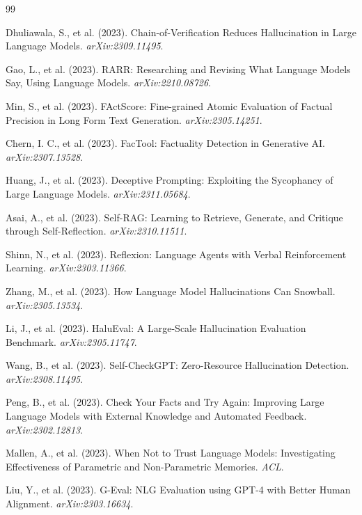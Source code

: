 \documentclass[12pt, a4paper]{report}
\begin{document}
\begin{thebibliography}{99}

         Dhuliawala, S., et al. (2023). Chain-of-Verification Reduces Hallucination in Large Language Models. \textit{arXiv:2309.11495}.

         Gao, L., et al. (2023). RARR: Researching and Revising What Language Models Say, Using Language Models. \textit{arXiv:2210.08726}.

         Min, S., et al. (2023). FActScore: Fine-grained Atomic Evaluation of Factual Precision in Long Form Text Generation. \textit{arXiv:2305.14251}.

         Chern, I. C., et al. (2023). FacTool: Factuality Detection in Generative AI. \textit{arXiv:2307.13528}.

         Huang, J., et al. (2023). Deceptive Prompting: Exploiting the Sycophancy of Large Language Models. \textit{arXiv:2311.05684}.

         Asai, A., et al. (2023). Self-RAG: Learning to Retrieve, Generate, and Critique through Self-Reflection. \textit{arXiv:2310.11511}.

         Shinn, N., et al. (2023). Reflexion: Language Agents with Verbal Reinforcement Learning. \textit{arXiv:2303.11366}.

         Zhang, M., et al. (2023). How Language Model Hallucinations Can Snowball. \textit{arXiv:2305.13534}.

         Li, J., et al. (2023). HaluEval: A Large-Scale Hallucination Evaluation Benchmark. \textit{arXiv:2305.11747}.

         Wang, B., et al. (2023). Self-CheckGPT: Zero-Resource Hallucination Detection. \textit{arXiv:2308.11495}.

         Peng, B., et al. (2023). Check Your Facts and Try Again: Improving Large Language Models with External Knowledge and Automated Feedback. \textit{arXiv:2302.12813}.

         Mallen, A., et al. (2023). When Not to Trust Language Models: Investigating Effectiveness of Parametric and Non-Parametric Memories. \textit{ACL}.

         Liu, Y., et al. (2023). G-Eval: NLG Evaluation using GPT-4 with Better Human Alignment. \textit{arXiv:2303.16634}.


\end{thebibliography}
\end{document}
